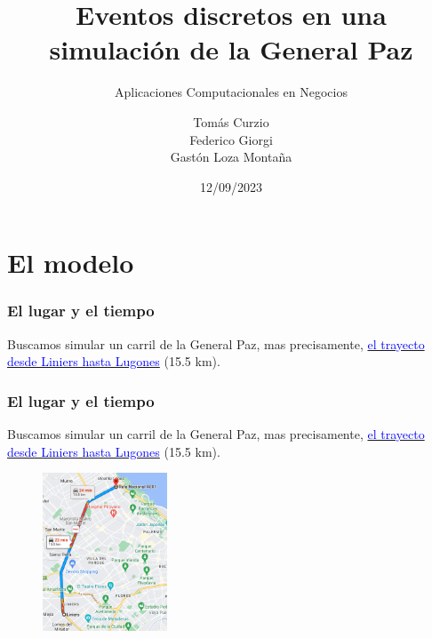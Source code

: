 \documentclass[10pt, compress]{beamer}
\title{Eventos discretos en una simulaci\'on de la General Paz }
\subtitle{Aplicaciones Computacionales en Negocios}
\date{12/09/2023}
\author{Tom\'as Curzio \\ Federico Giorgi \\ Gast\'on Loza Monta\~na  }
\institute{Universidad Torcuato Di Tella}
\begin{document}
\maketitle

\section{El modelo}

\begin{frame}[fragile]

\frametitle{El lugar y el tiempo}
Buscamos simular un carril de la General Paz, mas precisamente, \href{https://www.google.com.ar/maps/dir/-34.6549026,-58.5273448/RN+A001,+Buenos+Aires/@-34.5529941,-58.5215513,13z/data=!4m9!4m8!1m0!1m5!1m1!1s0x95bcb6a69ad1fc61:0x7f1d6a8008451498!2m2!1d-58.4682776!2d-34.5357282!3e0?entry=ttu}{\textcolor{blue}{el trayecto desde Liniers hasta Lugones}} (15.5 km). 

\end{frame}

\begin{frame}[fragile]

\frametitle{El lugar y el tiempo}
Buscamos simular un carril de la General Paz, mas precisamente, \href{https://www.google.com.ar/maps/dir/-34.6549026,-58.5273448/RN+A001,+Buenos+Aires/@-34.5529941,-58.5215513,13z/data=!4m9!4m8!1m0!1m5!1m1!1s0x95bcb6a69ad1fc61:0x7f1d6a8008451498!2m2!1d-58.4682776!2d-34.5357282!3e0?entry=ttu}{\textcolor{blue}{el trayecto desde Liniers hasta Lugones}} (15.5 km). 

\begin{figure}
\centering
\includegraphics[width=10em]{gmaps-recorrido}
\end{figure}

\end{frame}
\end{document}
